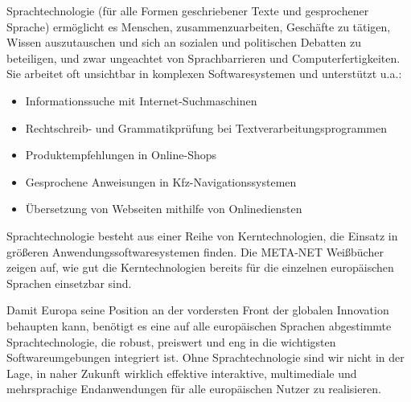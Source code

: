 \documentclass[]{../../metanetpaper}
\begin{document}
\begin{Parallel}[c]{80mm}{80mm}
{Sprachtechnologie (für alle Formen geschriebener Texte und gesprochener Sprache) ermöglicht es Menschen, zusammenzuarbeiten, Geschäfte zu tätigen, Wissen auszutauschen und sich an sozialen und politischen Debatten zu beteiligen, und zwar ungeachtet von Sprachbarrieren und Computerfertigkeiten. Sie arbeitet oft unsichtbar in komplexen Softwaresystemen und unterstützt u.a.:
    \begin{itemize}
      \item Informationssuche mit Internet-Suchmaschinen
      \item Rechtschreib- und Grammatikprüfung bei Textverarbeitungsprogrammen
      \item Produktempfehlungen in Online-Shops
      \item Gesprochene Anweisungen in Kfz-Navigationssystemen
      \item Übersetzung von Webseiten mithilfe von Onlinediensten
    \end{itemize}
Sprachtechnologie besteht aus einer Reihe von Kerntechnologien, die Einsatz in größeren Anwendungssoftwaresystemen finden. Die META-NET Weißbücher zeigen auf, wie gut die Kerntechnologien bereits für die einzelnen europäischen Sprachen einsetzbar sind. 

Damit Europa seine Position an der vordersten Front der globalen Innovation behaupten kann, benötigt es eine auf alle europäischen Sprachen abgestimmte Sprachtechnologie, die robust, preiswert und eng in die wichtigsten Softwareumgebungen integriert ist. Ohne Sprachtechnologie sind wir nicht in der Lage, in naher Zukunft wirklich effektive interaktive, multimediale und mehrsprachige Endanwendungen für alle europäischen Nutzer zu realisieren. 
  }

\end{Parallel}
\end{document}
